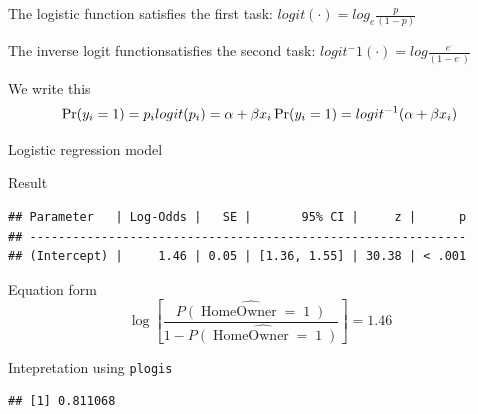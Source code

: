 \documentclass[
  ignorenonframetext,
]{beamer}
\begin{document}
\begin{frame}[fragile]
\begin{block}{The logistic function satisfies the first task:}
\protect\hypertarget{the-logistic-function-satisfies-the-first-task}{}
\(logit(\cdot) = log_e\frac{p}{(1-p)}\)
\end{block}

\begin{block}{The inverse logit functionsatisfies the second task:}
\protect\hypertarget{the-inverse-logit-functionsatisfies-the-second-task}{}
\(logit^-1(\cdot) = log\frac{e^\cdot}{(1-e^\cdot)}\)
\end{block}

\begin{block}{We write this}
\protect\hypertarget{we-write-this}{}
\[
\Pr(y_i = 1) = p_i \\
logit(p_i) = \alpha + \beta x_i \\
\Pr(y_i = 1) = logit^{-1}(\alpha + \beta x_i)
\]
\end{block}

\begin{block}{Logistic regression model}
\protect\hypertarget{logistic-regression-model}{}
\end{block}

\begin{block}{Result}
\protect\hypertarget{result}{}
\begin{verbatim}
## Parameter   | Log-Odds |   SE |       95% CI |     z |      p
## -------------------------------------------------------------
## (Intercept) |     1.46 | 0.05 | [1.36, 1.55] | 30.38 | < .001
\end{verbatim}
\end{block}

\begin{block}{Equation form}
\protect\hypertarget{equation-form}{}
\[
\log\left[ \frac { \widehat{P( \operatorname{HomeOwner} = \operatorname{1} )} }{ 1 - \widehat{P( \operatorname{HomeOwner} = \operatorname{1} )} } \right] = 1.46
\]

\begin{block}{Intepretation using \texttt{plogis}}
\protect\hypertarget{intepretation-using-plogis}{}
\begin{verbatim}
## [1] 0.811068
\end{verbatim}
\end{block}
\end{block}
\end{frame}
\end{document}
